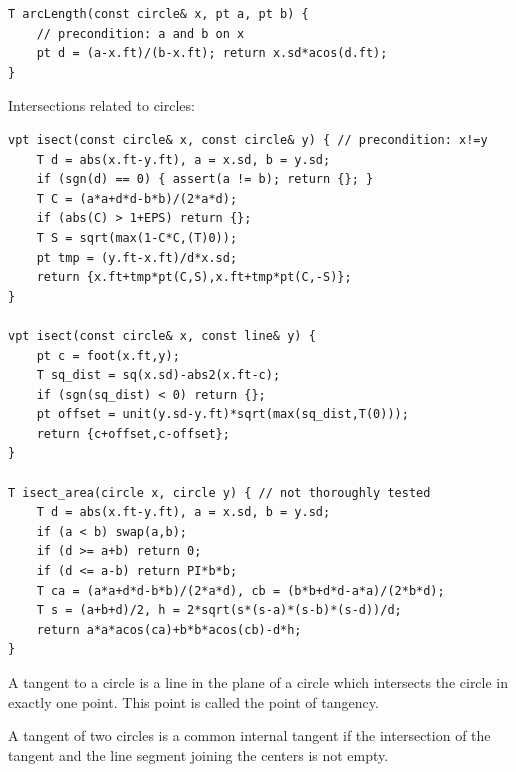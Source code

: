     \begin{lstlisting}
T arcLength(const circle& x, pt a, pt b) {
    // precondition: a and b on x
    pt d = (a-x.ft)/(b-x.ft); return x.sd*acos(d.ft); 
}
    \end{lstlisting}
    
    Intersections related to circles:
    \begin{lstlisting}
vpt isect(const circle& x, const circle& y) { // precondition: x!=y
    T d = abs(x.ft-y.ft), a = x.sd, b = y.sd; 
    if (sgn(d) == 0) { assert(a != b); return {}; }
    T C = (a*a+d*d-b*b)/(2*a*d); 
    if (abs(C) > 1+EPS) return {};
    T S = sqrt(max(1-C*C,(T)0)); 
    pt tmp = (y.ft-x.ft)/d*x.sd;
    return {x.ft+tmp*pt(C,S),x.ft+tmp*pt(C,-S)};
}

vpt isect(const circle& x, const line& y) {
    pt c = foot(x.ft,y); 
    T sq_dist = sq(x.sd)-abs2(x.ft-c);
    if (sgn(sq_dist) < 0) return {};
    pt offset = unit(y.sd-y.ft)*sqrt(max(sq_dist,T(0)));
    return {c+offset,c-offset};
}

T isect_area(circle x, circle y) { // not thoroughly tested
    T d = abs(x.ft-y.ft), a = x.sd, b = y.sd; 
    if (a < b) swap(a,b);
    if (d >= a+b) return 0;
    if (d <= a-b) return PI*b*b;
    T ca = (a*a+d*d-b*b)/(2*a*d), cb = (b*b+d*d-a*a)/(2*b*d);
    T s = (a+b+d)/2, h = 2*sqrt(s*(s-a)*(s-b)*(s-d))/d;
    return a*a*acos(ca)+b*b*acos(cb)-d*h;
}
    \end{lstlisting}

    A tangent to a circle is a line in the plane of a circle which intersects the circle in exactly one point. This point is called the point of tangency.

    A tangent of two circles is a common internal tangent if the intersection of the tangent and the line segment joining the centers is not empty.

